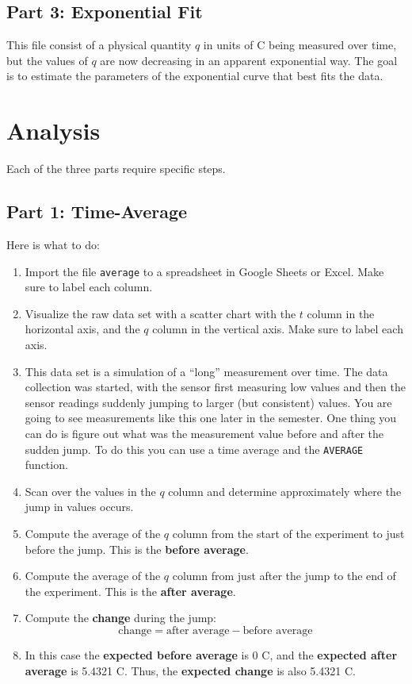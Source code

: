 \subsection{Part 3: Exponential Fit}
This file consist of a physical quantity $q$ in units of C being measured over time, but the values of $q$ are now decreasing in an apparent exponential way. The goal is to estimate the parameters of the exponential curve that best fits the data.
\section{Analysis}
Each of the three parts require specific steps.
\subsection{Part 1: Time-Average}
Here is what to do:
\begin{enumerate}
    \item Import the file \texttt{average} to a spreadsheet in Google Sheets or Excel. Make sure to label each column.
    \item Visualize the raw data set with a scatter chart with the $t$ column in the horizontal axis, and the $q$ column in the vertical axis. Make sure to label each axis.
    \item This data set is a simulation of a ``long'' measurement over time. The data collection was started, with the sensor first measuring low values and then the sensor readings suddenly jumping to larger (but consistent) values. You are going to see measurements like this one later in the semester. One thing you can do is figure out what was the measurement value before and after the sudden jump. To do this you can use a time average and the \texttt{AVERAGE} function.
    \item Scan over the values in the $q$ column and determine approximately where the jump in values occurs.
    \item Compute the average of the $q$ column from the start of the experiment to just before the jump. This is the \textbf{before average}.
    \item Compute the average of the $q$ column from just after the jump to the end of the experiment. This is the \textbf{after average}.
    \item Compute the \textbf{change} during the jump:
    \begin{equation*}
        \text{change} = \text{after average} - \text{before average}
    \end{equation*}
    \item In this case the \textbf{expected before average} is 0 C, and the \textbf{expected after average} is 5.4321 C. Thus, the \textbf{expected change} is also 5.4321 C.
\end{enumerate}
